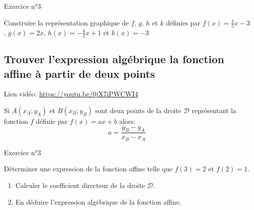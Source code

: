 \documentclass[12pt,a4paper]{article}
\begin{document}
\begin{framed}
\vspace{5cm}
\end{framed}

\begin{mybox}{Exercice n°3}

Construire la représentation graphique de $f$, $g$, $h$ et $k$ définies par $f(x)=\frac{4}{5}x-3$, $g(x)=2x$, $h(x)=-\frac{4}{3}x+1$ et $k(x)=-3$

\end{mybox}
\begin{center}
\end{center}






\subsection{Trouver l'expression algébrique la fonction affine à partir de deux points}


\begin{minipage}{0.85\textwidth}
Lien vidéo:
\url{https://youtu.be/0jX7iPWCWI4}
\end{minipage}
\begin{minipage}{0.2\textwidth}
\end{minipage}

\begin{pro}
Si $A(x_A;y_A)$ et $B(x_B;y_B)$ sont deux points de la droite $\mathscr{D}$ représentant la fonction $f$ définie par $f(x)=ax+b$ alors:
$$\boxed{a=\dfrac{y_B-y_A}{x_B-x_A}}$$
\end{pro}


\begin{mybox}{Exercice n°3}


Déterminer une expression de la fonction affine telle que $f(3)=2$ et $f(2)=1$.
\begin{enumerate}
    \item Calculer le coefficient directeur de la droite $\mathscr{D}$.
    \item En déduire l'expression algébrique de la fonction affine.
\end{enumerate}

\end{mybox}
\end{document}
